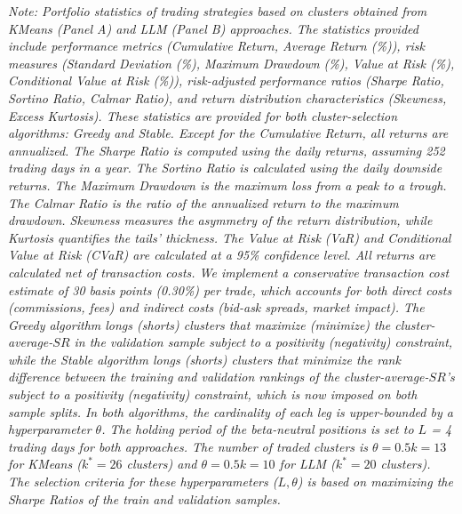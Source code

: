 \begin{table}[H]
\vspace{0.5cm}
\begin{minipage}{\textwidth}
\setlength{\parindent}{0pt}
{\small\textit{Note:
Portfolio statistics of trading strategies based on clusters obtained from KMeans (Panel A) and LLM (Panel B) approaches.
The statistics provided include performance metrics (Cumulative Return, Average Return (\%)), risk measures (Standard Deviation (\%), Maximum Drawdown (\%), Value at Risk (\%), Conditional Value at Risk (\%)), risk-adjusted performance ratios (Sharpe Ratio, Sortino Ratio, Calmar Ratio), and return distribution characteristics (Skewness, Excess Kurtosis). These statistics are provided for both cluster-selection algorithms: Greedy and Stable.
Except for the Cumulative Return, all returns are annualized. The Sharpe Ratio is computed using the daily returns, assuming 252 trading days in a year. The Sortino Ratio is calculated using the daily downside returns. The Maximum Drawdown is the maximum loss from a peak to a trough. The Calmar Ratio is the ratio of the annualized return to the maximum drawdown. Skewness measures the asymmetry of the return distribution, while Kurtosis quantifies the tails' thickness. The Value at Risk (VaR) and Conditional Value at Risk (CVaR) are calculated at a 95\% confidence level.
%
All returns are calculated net of transaction costs. We implement a conservative transaction cost estimate of 30 basis points (0.30\%) per trade, which accounts for both direct costs (commissions, fees) and indirect costs (bid-ask spreads, market impact). 
%
The Greedy algorithm longs (shorts) clusters that maximize (minimize) the cluster-average-$SR$ in the validation sample subject to a positivity (negativity) constraint, while the Stable algorithm longs (shorts) clusters that minimize the rank difference between the training and validation rankings of the cluster-average-$SR$'s subject to a positivity (negativity) constraint, which is now imposed on both sample splits. In both algorithms, the cardinality of each leg is upper-bounded by a hyperparameter $\theta$.
The holding period of the beta-neutral positions is set to $L$ = 4 trading days for both approaches. The number of traded clusters is $\theta = 0.5k=13$ for KMeans ($k^*=26$ clusters) and $\theta = 0.5k=10$ for LLM ($k^*=20$ clusters). The selection criteria for these hyperparameters ($L,\theta$) is based on maximizing the Sharpe Ratios of the train and validation samples.
}}
\end{minipage}
\end{table}